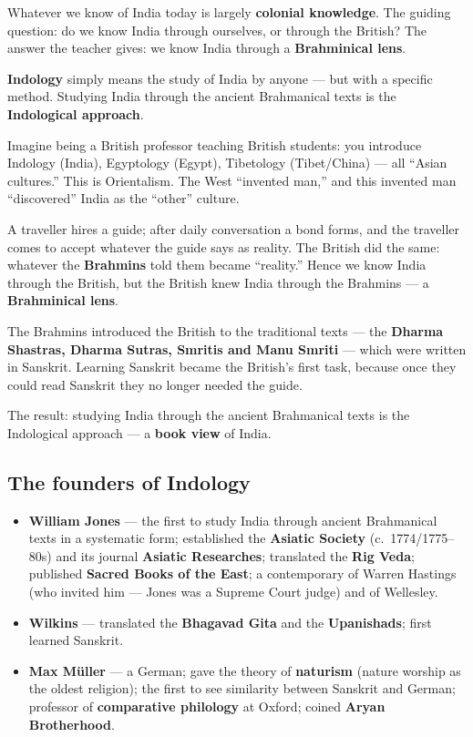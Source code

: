Whatever we know of India today is largely \textbf{colonial knowledge}. The guiding question: do we know India through ourselves, or through the British? The answer the teacher gives: we know India through a \textbf{Brahminical lens}.

\begin{KeyConcept}
\textbf{Indology} simply means the study of India by anyone --- but with a specific method. Studying India through the ancient Brahmanical texts is the \textbf{Indological approach}.
\end{KeyConcept}

Imagine being a British professor teaching British students: you introduce Indology (India), Egyptology (Egypt), Tibetology (Tibet/China) --- all ``Asian cultures.'' This is Orientalism. The West ``invented man,'' and this invented man ``discovered'' India as the ``other'' culture.

\begin{ExampleBox}
A traveller hires a guide; after daily conversation a bond forms, and the traveller comes to accept whatever the guide says as reality. The British did the same: whatever the \textbf{Brahmins} told them became ``reality.'' Hence we know India through the British, but the British knew India through the Brahmins --- a \textbf{Brahminical lens}.
\end{ExampleBox}

The Brahmins introduced the British to the traditional texts --- the \textbf{Dharma Shastras, Dharma Sutras, Smritis and Manu Smriti} --- which were written in Sanskrit. Learning Sanskrit became the British's first task, because once they could read Sanskrit they no longer needed the guide.

The result: studying India through the ancient Brahmanical texts is the Indological approach --- a \textbf{book view} of India.

\subsection{The founders of Indology}

\begin{itemize}
\item \textbf{William Jones} --- the first to study India through ancient Brahmanical texts in a systematic form; established the \textbf{Asiatic Society} (c.~1774/1775--80s) and its journal \textbf{Asiatic Researches}; translated the \textbf{Rig Veda}; published \textbf{Sacred Books of the East}; a contemporary of Warren Hastings (who invited him --- Jones was a Supreme Court judge) and of Wellesley.
\item \textbf{Wilkins} --- translated the \textbf{Bhagavad Gita} and the \textbf{Upanishads}; first learned Sanskrit.
\item \textbf{Max M\"uller} --- a German; gave the theory of \textbf{naturism} (nature worship as the oldest religion); the first to see similarity between Sanskrit and German; professor of \textbf{comparative philology} at Oxford; coined \textbf{Aryan Brotherhood}.
\end{itemize}

